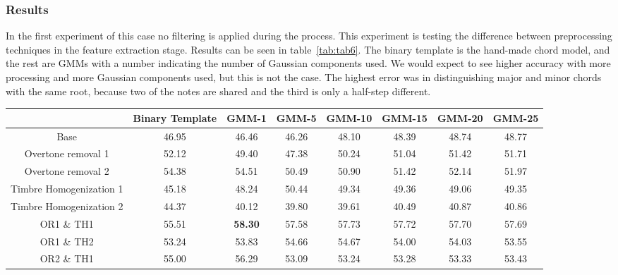 \documentclass{sig-alternate}
\begin{document}
\subsubsection{Results}

In the first experiment of this case no filtering is applied during the process. This experiment is testing the difference between preprocessing techniques in the feature extraction stage. Results can be seen in table~\ref{tab:tab6}. The binary template is the hand-made chord model, and the rest are GMMs with a number indicating the number of Gaussian components used. We would expect to see higher accuracy with more processing and more Gaussian components used, but this is not the case. The highest error was in distinguishing major and minor chords with the same root, because two of the notes are shared and the third is only a half-step different.


\begin{table*}
\centering
\begin{tabular}{|c|c|c|c|c|c|c|c|} \hline
 & Binary Template & GMM-1 & GMM-5 & GMM-10 & GMM-15 & GMM-20 & GMM-25 \\ \hline
Base & 46.95 & 46.46 & 46.26 & 48.10 & 48.39 & 48.74 & 48.77 \\ \hline
Overtone removal 1 & 52.12 & 49.40 & 47.38 & 50.24 & 51.04 & 51.42 & 51.71 \\ \hline
Overtone removal 2 & 54.38 & 54.51 & 50.49 & 50.90 & 51.42 & 52.14 & 51.97 \\ \hline
Timbre Homogenization 1 & 45.18 & 48.24 & 50.44 & 49.34 & 49.36 & 49.06 & 49.35 \\ \hline
Timbre Homogenization 2 & 44.37 & 40.12 & 39.80 & 39.61 & 40.49 & 40.87 & 40.86 \\ \hline
OR1 \& TH1 & 55.51 & \textbf{58.30} & 57.58 & 57.73 & 57.72 & 57.70 & 57.69 \\ \hline
OR1 \& TH2 & 53.24 & 53.83 & 54.66 & 54.67 & 54.00 & 54.03 & 53.55 \\ \hline
OR2 \& TH1 & 55.00 & 56.29 & 53.09 & 53.24 & 53.28 & 53.33 & 53.43 \\ \hline
\end{tabular}
\caption{Average accuracy without filtering (research case 3~\cite{TaeMin:2014}, experiment 1).}
\label{tab:tab6}
\end{table*}

\end{document}
